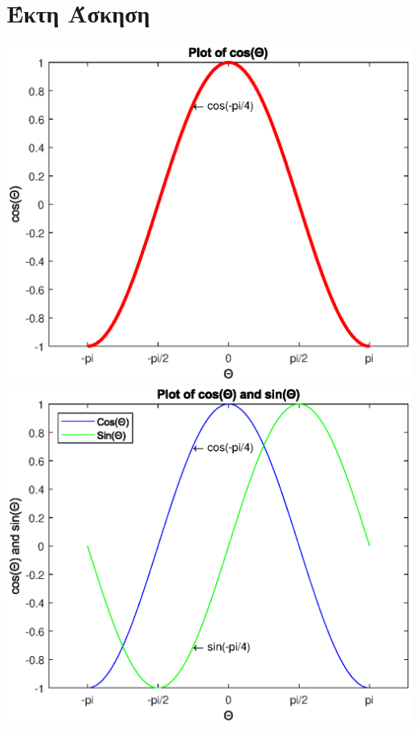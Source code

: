 \documentclass[a4paper,11pt]{article}
\begin{document}
    \section{Έκτη Άσκηση}
        \begin{center}
            \includegraphics[width=.9\linewidth]{PlotOfCos.eps}\quad
            \\[\baselineskip]
            \includegraphics[width=.9\linewidth]{PlotOfCosAndSin.eps}\quad
        \end{center}
    
\end{document}
